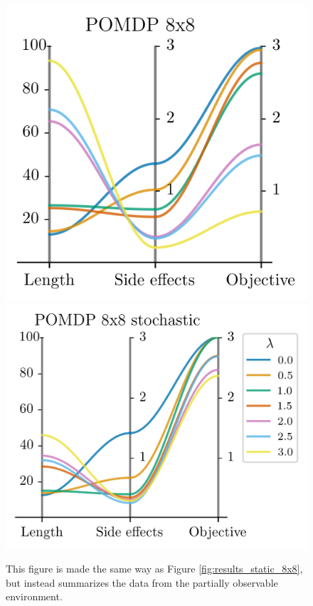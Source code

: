 \documentclass[12pt,A4]{report}
\theoremstyle{definition}
\begin{document}
\begin{figure}[H]
  \centering
  \includegraphics{"./figures/pomdp_8x8_results.png"}
  \includegraphics{"./figures/pomdp_8x8_stochastic_results.png"}
  \caption{This figure is made the same way as Figure \ref{fig:results_static_8x8}, but instead summarizes the data from the partially observable environment.}
  \label{fig:results_pomdp_8x8}
\end{figure}
\end{document}
